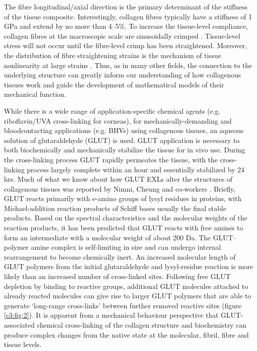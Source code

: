     
    The fibre longitudinal/axial direction is the primary determinant of the stiffness of the tissue composite. Interestingly, collagen fibres typically have a stiffness of 1 GPa \cite{shen_stress_2008,gentleman_mechanical_2003,eppell_nano_2006,yang_mechanical_2008} and extend by no more than 4–5\%. 
    To increase the tissue-level compliance, collagen fibres at the macroscopic scale are sinusoidally crimped \cite{parry_molecular_1988}. Tissue-level stress will not occur until the fibre-level crimp has been straightened. Moreover, the distribution of fibre straightening strains is the mechanism of tissue nonlinearity at large strains \cite{lanir_constitutive_1983,sacks_multiaxial_2003}. Thus, as in many other fields, the connection to the underlying structure can greatly inform our understanding of how collagenous tissues work and guide the development of mathematical models of their mechanical function.


    While there is a wide range of application-specific chemical agents (e.g. riboflavin/UVA cross-linking for corneas), for mechanically-demanding and blood\Hyphdash contacting applications (e.g. BHVs) using collagenous tissues, an aqueous solution of glutaraldehyde (GLUT) is used. GLUT application is necessary to both biochemically and mechanically stabilize the tissue for in vivo use. During the cross-linking process GLUT rapidly permeates the tissue, with the cross-linking process largely complete within an hour and essentially stabilized by 24 hrs. Much of what we know about how GLUT EXLs alter the structures of collagenous tissues was reported by Nimni, Cheung and co-workers \cite{cheung_mechanism_1990,nimni_chemically_1987,cheung_mechanism_1985,gendler_toxic_1984,cheung_presence_1983,cheung_mechanism_1982,cheung_mechanism_1982II}. Briefly, GLUT reacts primarily with e-amino groups of lysyl residues in proteins, with Michael-addition reaction products of Schiff bases usually the final stable products. Based on the spectral characteristics and the molecular weights of the reaction products, it has been predicted that GLUT reacts with free amines to form an intermediate with a molecular weight of about 200 Da. The GLUT–polymer amine complex is self-limiting in size and can undergo internal rearrangement to become chemically inert. An increased molecular length of GLUT polymers from the initial glutaraldehyde and lysyl-residue reaction is more likely than an increased number of cross-linked sites. Following free GLUT depletion by binding to reactive groups, additional GLUT molecules attached to already reacted molecules can give rise to larger GLUT polymers that are able to generate ‘long-range cross-links’ between further removed reactive sites (figure \ref{c3:fig:2}). It is apparent from a mechanical behaviour perspective that GLUT-associated chemical cross-linking of the collagen structure and biochemistry can produce complex changes from the native state at the molecular, fibril, fibre and tissue levels.
    
